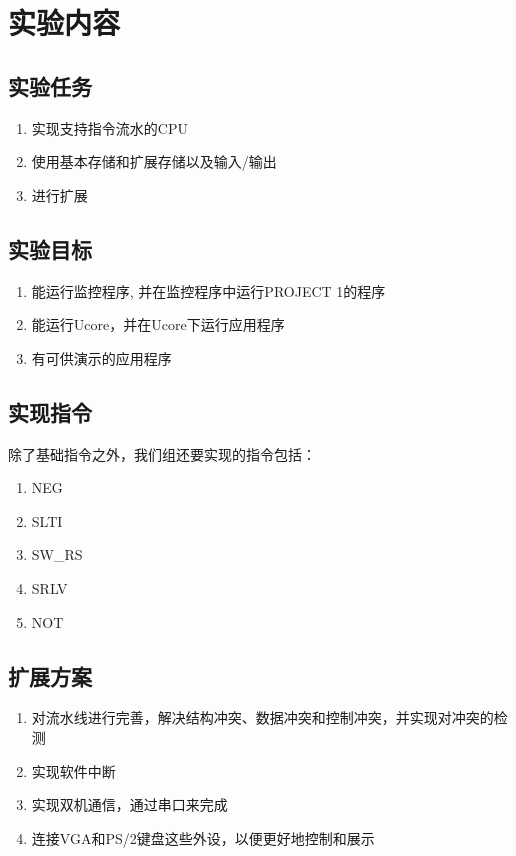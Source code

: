 \documentclass[10pt]{article}
\newcommand{\Original}{\fontsize{25pt}{\baselineskip}\selectfont}
\begin{document}
\large
\title{\Original{大实验开题报告}}
\author{刘玟彤\quad 学号: 2015011254 \\ 王诗媛\quad 学号：2015011483 \\ 徐禹生 \quad 学号：2015011244}

\maketitle

\section{实验内容}
\subsection{实验任务}
\begin{enumerate}
\item 实现支持指令流水的CPU
\item 使用基本存储和扩展存储以及输入/输出
\item 进行扩展
\end{enumerate}
\subsection{实验目标}
\begin{enumerate}
\item 能运行监控程序, 并在监控程序中运行PROJECT 1的程序
\item 能运行Ucore，并在Ucore下运行应用程序
\item 有可供演示的应用程序
\end{enumerate}
\subsection{实现指令}
除了基础指令之外，我们组还要实现的指令包括：
\begin{enumerate}
\item NEG
\item SLTI
\item SW\_RS
\item SRLV
\item NOT
\end{enumerate}
\subsection{扩展方案}
\begin{enumerate}
\item 对流水线进行完善，解决结构冲突、数据冲突和控制冲突，并实现对冲突的检测
\item 实现软件中断
\item 实现双机通信，通过串口来完成
\item 连接VGA和PS/2键盘这些外设，以便更好地控制和展示
\end{enumerate}
\end{document}

